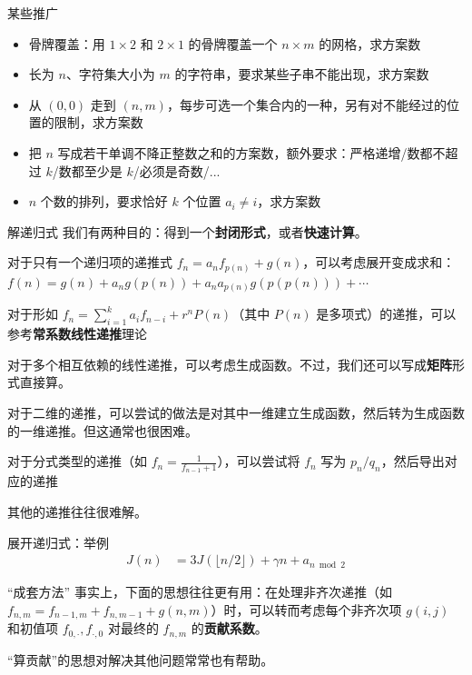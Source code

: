 \begin{frame}{某些推广}
    \begin{itemize}
        \item 骨牌覆盖：用 $1\times 2$ 和 $2\times 1$ 的骨牌覆盖一个 $n\times m$ 的网格，求方案数
        \item 长为 $n$、字符集大小为 $m$ 的字符串，要求某些子串不能出现，求方案数
        \item 从 $(0,0)$ 走到 $(n,m)$，每步可选一个集合内的一种，另有对不能经过的位置的限制，求方案数
        \item 把 $n$ 写成若干单调不降正整数之和的方案数，额外要求：严格递增/数都不超过 $k$/数都至少是 $k$/必须是奇数/...
        \item $n$ 个数的排列，要求恰好 $k$ 个位置 $a_i\ne i$，求方案数
    \end{itemize}
\end{frame}
\begin{frame}{解递归式}
    我们有两种目的：得到一个\textbf{封闭形式}，或者\textbf{快速计算}。

    对于只有一个递归项的递推式 $f_n=a_n f_{p(n)}+g(n)$，可以考虑展开变成求和：$f(n)=g(n)+a_n g(p(n))+a_na_{p(n)}g(p(p(n)))+\cdots$

    对于形如 $f_n=\sum_{i=1}^k a_i f_{n-i}+r^nP(n)$（其中 $P(n)$ 是多项式）的递推，可以参考\textbf{常系数线性递推}理论

    对于多个相互依赖的线性递推，可以考虑生成函数。不过，我们还可以写成\textbf{矩阵}形式直接算。

    对于二维的递推，可以尝试的做法是对其中一维建立生成函数，然后转为生成函数的一维递推。但这通常也很困难。

    对于分式类型的递推（如 $f_n=\frac{1}{f_{n-1}+1}$），可以尝试将 $f_n$ 写为 $p_n/q_n$，然后导出对应的递推

    其他的递推往往很难解。
\end{frame}
\begin{frame}{展开递归式：举例}
    $$
    \begin{aligned}
        J(n)&=3J(\lfloor n/2\rfloor)+\gamma n+a_{n\bmod 2}
    \end{aligned}
    $$

\end{frame}

\begin{frame}{“成套方法”}
    事实上，下面的思想往往更有用：在处理非齐次递推（如 $f_{n,m}=f_{n-1,m}+f_{n,m-1}+g(n,m)$）时，可以转而考虑每个非齐次项 $g(i,j)$ 和初值项 $f_{0,\cdot},f_{\cdot,0}$ 对最终的 $f_{n,m}$ 的\textbf{贡献系数}。

    “算贡献”的思想对解决其他问题常常也有帮助。
\end{frame}
